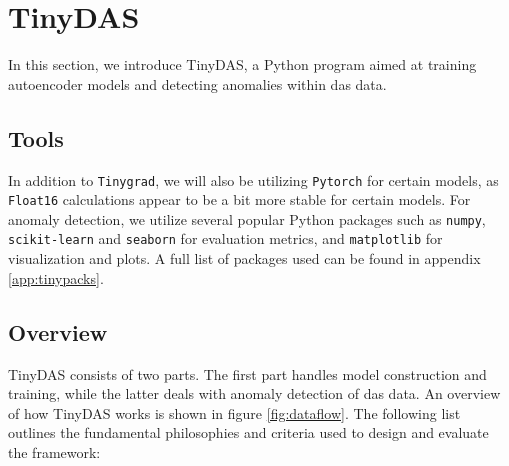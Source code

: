\section{TinyDAS}

In this section, we introduce TinyDAS, a Python program aimed at training autoencoder models and detecting anomalies within \acrshort{das} data. 

\subsection{Tools}

In addition to \texttt{Tinygrad}, we will also be utilizing \texttt{Pytorch} for certain models, as \texttt{Float16} calculations appear to be a bit more stable for certain models. For anomaly detection, we utilize several popular Python packages such as \texttt{numpy}, \texttt{scikit-learn} and \texttt{seaborn} for evaluation metrics, and \texttt{matplotlib} for visualization and plots. A full list of packages used can be found in 
appendix \ref{app:tinypacks}.


\subsection{Overview}

TinyDAS consists of two parts. The first part handles model construction and training, while the latter deals with anomaly detection of \acrshort{das} data. An overview of how TinyDAS works is shown in figure \ref{fig:dataflow}. The following list outlines the fundamental philosophies and criteria used to design and evaluate the framework:


